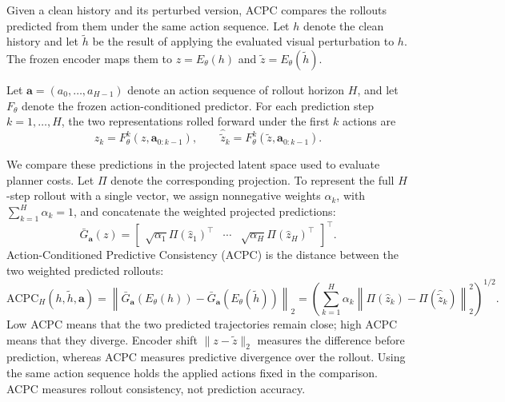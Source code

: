 Given a clean history and its perturbed version, ACPC compares the rollouts
predicted from them under the same action sequence. Let $h$ denote the clean
history and let $\tilde h$ be the result of applying the evaluated visual
perturbation to $h$. The frozen encoder maps them to $z=E_\theta(h)$ and
$\tilde z=E_\theta(\tilde h)$.

Let $\mathbf a=(a_0,\ldots,a_{H-1})$ denote an action sequence of rollout
horizon $H$, and let $F_\theta$ denote the frozen action-conditioned
predictor. For each prediction step $k=1,\ldots,H$, the two representations
rolled forward under the first $k$ actions are
\begin{equation}
\hat z_k=F_\theta^k(z,\mathbf a_{0:k-1}),
\qquad
\hat{\tilde z}_k=F_\theta^k(\tilde z,\mathbf a_{0:k-1}).
\label{eq:acpc-rollout-objects}
\end{equation}

We compare these predictions in the projected latent space used to evaluate
planner costs. Let $\Pi$ denote the corresponding projection. To represent the
full $H$-step rollout with a single vector, we assign nonnegative weights
$\alpha_k$, with $\sum_{k=1}^H\alpha_k=1$, and concatenate the weighted
projected predictions:
\begin{equation}
\bar G_{\mathbf a}(z)
=
\begin{bmatrix}
\sqrt{\alpha_1}\Pi(\hat z_1)^\top & \cdots &
\sqrt{\alpha_H}\Pi(\hat z_H)^\top
\end{bmatrix}^{\!\top}.
\label{eq:weighted-rollout-map}
\end{equation}
Action-Conditioned Predictive Consistency (ACPC) is the distance between the
two weighted predicted rollouts:
\begin{equation}
\mathrm{ACPC}_H(h,\tilde h,\mathbf a)
=
\left\|\bar G_{\mathbf a}(E_\theta(h))
-\bar G_{\mathbf a}(E_\theta(\tilde h))\right\|_2
=
\left(
\sum_{k=1}^H\alpha_k
\left\|\Pi(\hat z_k)-\Pi(\hat{\tilde z}_k)\right\|_2^2
\right)^{1/2}.
\label{eq:acpc-h}
\end{equation}
Low ACPC means that the two predicted trajectories remain close; high ACPC
means that they diverge. Encoder shift $\|z-\tilde z\|_2$ measures the
difference before prediction, whereas ACPC measures predictive divergence over
the rollout. Using the same action sequence holds the applied actions fixed in
the comparison. ACPC measures rollout consistency, not prediction accuracy.



